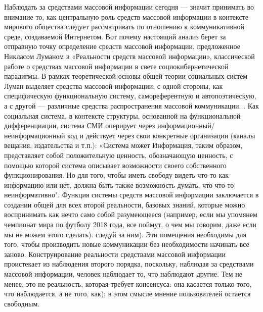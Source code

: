 \documentclass[a4page]{article}
\begin{document}
Наблюдать за средствами массовой информации сегодня — значит принимать во внимание то, как центральную роль средств массовой информации в контексте мирового общества следует рассматривать по отношению к коммуникативной среде, создаваемой Интернетом. Вот почему настоящий анализ берет за отправную точку определение средств массовой информации, предложенное Никласом Луманом в «Реальности средств массовой информации\cite{reality_of_mass_media}», классической работе о средствах массовой информации в свете социокибернетической парадигмы. В рамках теоретической основы общей теории социальных систем Луман выделяет средства массовой информации, с одной стороны, как специфическую функциональную систему, самореферентную и автопоэтическую, а с другой — различные средства распространения массовой коммуникации. . Как социальная система, в контексте структуры, основанной на функциональной дифференциации, система СМИ оперирует через информационный/неинформационный код и действует через свои конкретные организации (каналы вещания, издательства и т.п.): «Система может Информация, таким образом, представляет собой положительную ценность, обозначающую ценность, с помощью которой система описывает возможности своего собственного функционирования. Но для того, чтобы иметь свободу видеть что-то как информацию или нет, должна быть также возможность думать, что что-то неинформативно"\cite{reality_of_mass_media}. Функция системы средств массовой информации заключается в создании общей для всех второй реальности, базовых знаний, которые можно воспринимать как нечто само собой разумеющееся (например, если мы упомянем чемпионат мира по футболу 2018 года, все поймут, о чем мы говорим, даже если мы не можем этого сделать). следуй за ним). Эти помещения необходимы для того, чтобы производить новые коммуникации без необходимости начинать все заново. Конструирование реальности средствами массовой информации проистекает из наблюдения второго порядка, поскольку, наблюдая за средствами массовой информации, человек наблюдает то, что наблюдают другие. Тем не менее, это не реальность, которая требует консенсуса: она касается только того, что наблюдается, а не того, как); в этом смысле мнение пользователей остается свободным.
\end{document}
